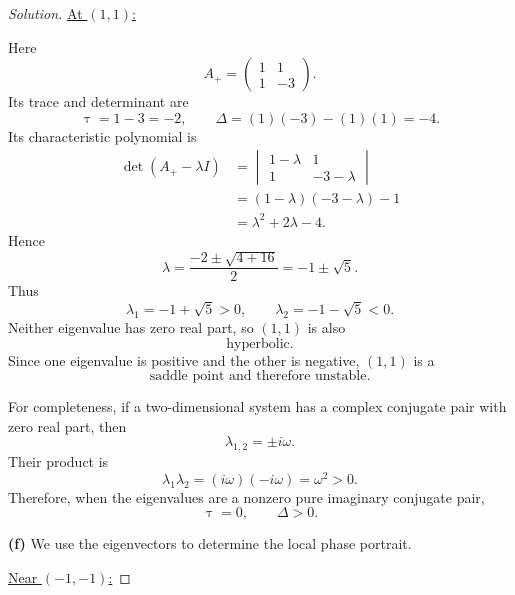 \documentclass[12pt]{amsart}
\theoremstyle{conjecture}
\theoremstyle{definition}
\theoremstyle{question}
\theoremstyle{theorem}
\newenvironment{solution}
{\begin{proof}[Solution]}
{\end{proof}}
\begin{document}
\begin{solution}
        \medskip
        \underline{At $(1,1)$:}

        Here
        \[
            A_+=
            \begin{pmatrix}
                1 & 1\\
                1 & -3
            \end{pmatrix}.
        \]
        Its trace and determinant are
        \[
            \uptau=1-3=-2,
            \qquad
            \Delta=(1)(-3)-(1)(1)=-4.
        \]
        Its characteristic polynomial is
        \begin{align*}
            \det(A_+-\lambda I)
            &=
            \begin{vmatrix}
                1-\lambda & 1\\
                1 & -3-\lambda
            \end{vmatrix}\\
            &=(1-\lambda)(-3-\lambda)-1\\
            &=\lambda^2+2\lambda-4.
        \end{align*}
        Hence
        \[
            \lambda
            =
            \frac{-2\pm\sqrt{4+16}}{2}
            =
            -1\pm\sqrt{5}.
        \]
        Thus
        \[
            \boxed{
                \lambda_1=-1+\sqrt{5}>0,
                \qquad
                \lambda_2=-1-\sqrt{5}<0.}
        \]
        Neither eigenvalue has zero real part, so $(1,1)$ is also
        \[
            \boxed{\text{hyperbolic}.}
        \]
        Since one eigenvalue is positive and the other is negative, $(1,1)$
        is a
        \[
            \boxed{\text{saddle point and therefore unstable}.}
        \]

        For completeness, if a two-dimensional system has a complex
        conjugate pair with zero real part, then
        \[
            \lambda_{1,2}=\pm i\omega.
        \]
        Their product is
        \[
            \lambda_1\lambda_2
            =(i\omega)(-i\omega)=\omega^2>0.
        \]
        Therefore, when the eigenvalues are a nonzero pure imaginary
        conjugate pair,
        \[
            \boxed{\uptau=0,\qquad \Delta>0.}
        \]

        \bigskip

        \textbf{(f)} We use the eigenvectors to determine the local phase
        portrait.

        \medskip
        \underline{Near $(-1,-1)$:}


\end{solution}
\end{document}
